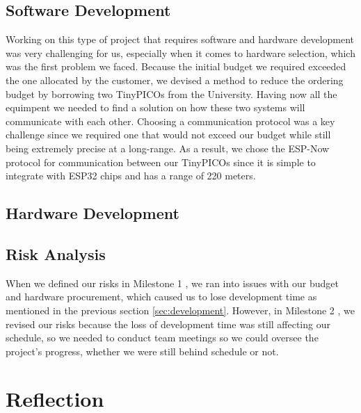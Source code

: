     \subsection{Software Development}
    \label{ssec:software}

    Working on this type of project that requires software and hardware development was very challenging for us, especially when it comes to hardware selection, which was the first problem we faced. Because the initial budget we required exceeded the one allocated by the customer, we devised a method to reduce the ordering budget by borrowing two TinyPICOs from the University. Having now all the equimpent we needed to find a solution on how these two systems will communicate with each other. Choosing a communication protocol was a key challenge since we required one that would not exceed our budget while still being extremely precise at a long-range. As a result, we chose the ESP-Now protocol for communication between our TinyPICOs since it is simple to integrate with ESP32 chips and has a range of 220 meters.


    \subsection{Hardware Development}
    \label{ssec:hardware}


    \subsection{Risk Analysis}
    \label{ssec:}

    When we defined our risks in Milestone 1 \cite{coaker}, we ran into issues with our budget and hardware procurement, which caused us to lose development time as mentioned in the previous section \ref{sec:development}. However, in Milestone 2 \cite{mile2}, we revised our risks because the loss of development time was still affecting our schedule, so we needed to conduct team meetings so we could oversee the project's progress, whether we were still behind schedule or not.

    \section{Reflection}
    \label{sec:Reflection}

